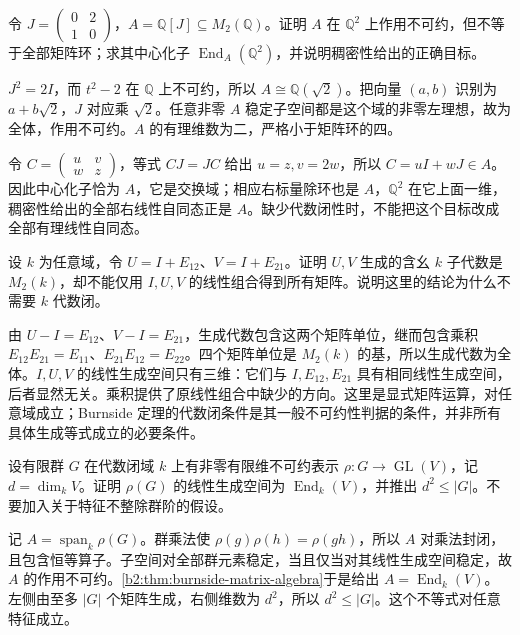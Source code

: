 \begin{exercise}\label{b2:ex:14-burnside-rational-counterexample}
	令 \(J=\begin{pmatrix}0&2\\1&0\end{pmatrix}\)，\(A=\mathbb Q[J]\subseteq M_2(\mathbb Q)\)。证明 \(A\) 在 \(\mathbb Q^2\) 上作用不可约，但不等于全部矩阵环；求其中心化子 \(\operatorname{End}_A(\mathbb Q^2)\)，并说明稠密性给出的正确目标。
\end{exercise}
\begin{solution}
	\(J^2=2I\)，而 \(t^2-2\) 在 \(\mathbb Q\) 上不可约，所以 \(A\cong\mathbb Q(\sqrt2)\)。把向量 \((a,b)\) 识别为 \(a+b\sqrt2\)，\(J\) 对应乘 \(\sqrt2\)。任意非零 \(A\) 稳定子空间都是这个域的非零左理想，故为全体，作用不可约。\(A\) 的有理维数为二，严格小于矩阵环的四。

	令 \(C=\begin{pmatrix}u&v\\w&z\end{pmatrix}\)，等式 \(CJ=JC\) 给出 \(u=z,v=2w\)，所以 \(C=uI+wJ\in A\)。因此中心化子恰为 \(A\)，它是交换域；相应右标量除环也是 \(A\)，\(\mathbb Q^2\) 在它上面一维，稠密性给出的全部右线性自同态正是 \(A\)。缺少代数闭性时，不能把这个目标改成全部有理线性自同态。
\end{solution}

\begin{exercise}\label{b2:ex:14-algebra-generation}
	设 \(k\) 为任意域，令 \(U=I+E_{12}\)、\(V=I+E_{21}\)。证明 \(U,V\) 生成的含幺 \(k\) 子代数是 \(M_2(k)\)，却不能仅用 \(I,U,V\) 的线性组合得到所有矩阵。说明这里的结论为什么不需要 \(k\) 代数闭。
\end{exercise}
\begin{solution}
	由 \(U-I=E_{12}\)、\(V-I=E_{21}\)，生成代数包含这两个矩阵单位，继而包含乘积 \(E_{12}E_{21}=E_{11}\)、\(E_{21}E_{12}=E_{22}\)。四个矩阵单位是 \(M_2(k)\) 的基，所以生成代数为全体。\(I,U,V\) 的线性生成空间只有三维：它们与 \(I,E_{12},E_{21}\) 具有相同线性生成空间，后者显然无关。乘积提供了原线性组合中缺少的方向。这里是显式矩阵运算，对任意域成立；Burnside 定理的代数闭条件是其一般不可约性判据的条件，并非所有具体生成等式成立的必要条件。
\end{solution}

\begin{exercise}\label{b2:ex:14-group-degree-bound}
	设有限群 \(G\) 在代数闭域 \(k\) 上有非零有限维不可约表示 \(\rho:G\rightarrow\operatorname{GL}(V)\)，记 \(d=\dim_kV\)。证明 \(\rho(G)\) 的线性生成空间为 \(\operatorname{End}_k(V)\)，并推出 \(d^2\le |G|\)。不要加入关于特征不整除群阶的假设。
\end{exercise}
\begin{solution}
	记 \(A=\operatorname{span}_k\rho(G)\)。群乘法使 \(\rho(g)\rho(h)=\rho(gh)\)，所以 \(A\) 对乘法封闭，且包含恒等算子。子空间对全部群元素稳定，当且仅当对其线性生成空间稳定，故 \(A\) 的作用不可约。\cref{b2:thm:burnside-matrix-algebra}于是给出 \(A=\operatorname{End}_k(V)\)。左侧由至多 \(|G|\) 个矩阵生成，右侧维数为 \(d^2\)，所以 \(d^2\le|G|\)。这个不等式对任意特征成立。
\end{solution}
